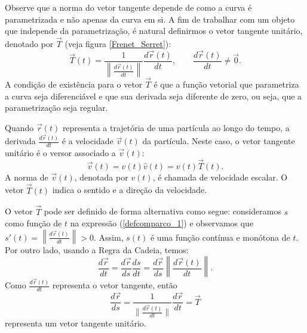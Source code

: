 Observe que a norma do vetor tangente depende de como a curva é parametrizada e não apenas da curva em si. A fim de trabalhar com um objeto que independe da parametrização, é natural definirmos o vetor tangente unitário, denotado por $\vec{T}$ (veja figura \ref{Frenet_Serret}):
\begin{equation}\label{defvecunit}
\vec{T}(t)=\frac{1}{\left\|\frac{d\vec{r}(t)}{dt}\right\|}\frac{d\vec{r}(t)}{dt},\qquad \frac{d\vec{r}(t)}{dt} \neq \vec{0}.
\end{equation}
A condição de existência para o vetor $\vec{T}$ é que a função vetorial que parametriza a curva seja diferenciável e que sua derivada seja diferente de zero, ou seja, que a parametrização seja regular.

\begin{obs} Quando $\vec{r}(t)$ representa a trajetória de uma partícula ao longo do tempo, a derivada $\frac{d\vec{r}(t)}{dt} $ é a velocidade $\vec{v}(t)$ da partícula. Neste caso, o vetor tangente unitário é o versor associado a $\vec{v}(t)$:
$$\vec{v}(t)=v(t) \hat{v}(t)=v(t) \vec{T}(t).$$
A norma de $\vec{v}(t)$, denotada por $v(t)$, é chamada de velocidade escalar. O vetor $\vec{T}(t)$ indica o sentido e a direção da velocidade.
\end{obs}

O vetor $\vec{T}$ pode ser definido de forma alternativa como segue: consideramos $s$ como função de $t$ na expressão (\ref{defcomparco_1}) e observamos que $s'(t)=\left\|\frac{d\vec{r}(t)}{dt}\right\|>0$. Assim, $s(t)$ é uma função contínua e monótona de $t$. Por outro lado, usando a Regra da Cadeia, temos:
$$
\frac{d\vec{r}}{dt}=\frac{d\vec{r}}{ds}\frac{ds}{dt}=\frac{d\vec{r}}{ds}\left\|\frac{d\vec{r}(t)}{dt}\right\|.
$$
Como $\frac{d\vec{r}(t)}{dt}$ representa o vetor tangente, então
$$
\frac{d\vec{r}}{ds}=\frac{1}{\|\frac{d\vec{r}(t)}{dt}\|}\frac{d\vec{r}}{dt}=\vec{T}
$$
representa um vetor tangente unitário.


